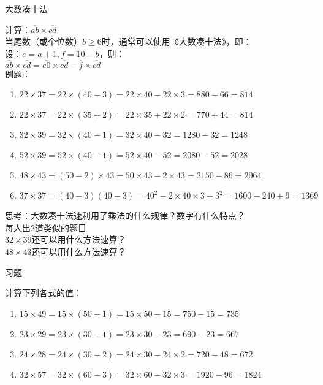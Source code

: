 \documentclass[aspectratio=169]{ctexbeamer} %
\begin{document}
\begin{frame}[t]{大数凑十法}
\begin{spacing}{1.2}
\normalsize
计算：$\overline{ab} \times \overline{cd}$ \\
当尾数（或个位数）$b \ge 6$时，通常可以使用《大数凑十法》，即：\\
设：$e = a+1, f = 10-b$，则：\\
$\overline{ab} \times \overline{cd} = \overline{e0} \times \overline{cd} - \overline{f} \times \overline{cd}$ \\
例题：
\begin{enumerate}[label={\arabic*.}]
\item $22 \times 37  = 22 \times (40-3) = 22 \times 40 - 22 \times 3 = 880 - 66 = 814$
\item $22 \times 37  = 22 \times (35+2) = 22 \times 35 + 22 \times 2 = 770 + 44 = 814$
\item $32 \times 39  = 32 \times (40-1)=32 \times 40 - 32=1280-32=1248$
\item $52 \times 39  = 52 \times (40-1)=52 \times 40 - 52=2080-52=2028$
\item $48 \times 43  = (50-2) \times 43=50 \times 43 - 2 \times 43=2150-86=2064$
\item $37 \times 37  = (40-3)(40-3)=40^2 - 2\times40\times3 +3^2=1600-240+9=1369$

\end{enumerate}
\alert{思考：大数凑十法速利用了乘法的什么规律？数字有什么特点？}\\
\alert{每人出2道类似的题目}  \\
\alert{$32 \times 39 $还可以用什么方法速算？} \\
\alert{$48 \times 43 $还可以用什么方法速算？}
\end{spacing}
\end{frame}

\begin{frame}[t]{习题}
\begin{spacing}{1.2}
\normalsize
计算下列各式的值：
\begin{enumerate}[label={\arabic*.}]
\item $15 \times 49  = 15 \times (50-1) = 15 \times 50 - 15 = 750 - 15 = 735$
\item $23 \times 29  = 23 \times (30-1) = 23 \times 30 - 23 = 690 - 23 = 667$
\item $24 \times 28  = 24 \times (30-2) = 24 \times 30 - 24 \times 2 = 720 - 48 = 672$
\item $32 \times 57  = 32 \times (60-3) = 32 \times 60 - 32 \times 3 = 1920 - 96 = 1824$
\end{enumerate}

\end{spacing}
\end{frame}
\end{document}
